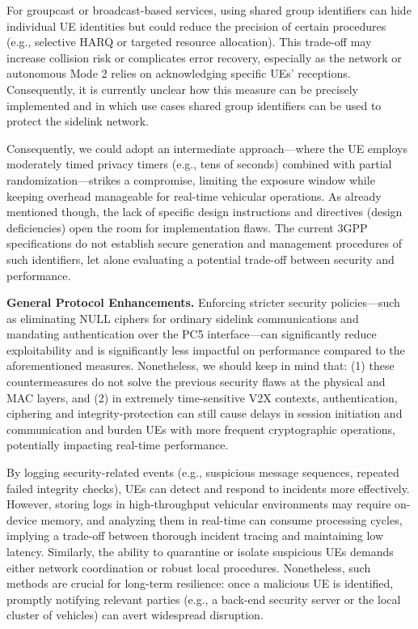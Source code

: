 For groupcast or broadcast-based services, using shared group identifiers can hide individual UE identities but could reduce the precision of certain procedures (e.g., selective HARQ or targeted resource allocation). This trade-off may increase collision risk or complicates error recovery, especially as the network or autonomous Mode 2 relies on acknowledging specific UEs’ receptions. Consequently, it is currently unclear how this measure can be precisely implemented and in which use cases shared group identifiers can be used to protect the sidelink network.

Consequently, we could adopt an intermediate approach—where the UE employs moderately timed privacy timers (e.g., tens of seconds) combined with partial randomization—strikes a compromise, limiting the exposure window while keeping overhead manageable for real-time vehicular operations. As already mentioned though, the lack of specific design instructions and directives (design deficiencies) open the room for implementation flaws. The current 3GPP specifications do not establish secure generation and management procedures of such identifiers, let alone evaluating a potential trade-off between security and performance.

\textbf{General Protocol Enhancements.} Enforcing stricter security policies—such as eliminating NULL ciphers for ordinary sidelink communications and mandating authentication over the PC5 interface—can significantly reduce exploitability and is significantly less impactful on performance compared to the aforementioned measures. Nonetheless, we should keep in mind that: (1) these countermeasures do not solve the previous security flaws at the physical and MAC layers, and (2) in extremely time-sensitive V2X contexts, authentication, ciphering and integrity-protection can still cause delays in session initiation and communication and burden UEs with more frequent cryptographic operations, potentially impacting real-time performance. 

By logging security-related events (e.g., suspicious message sequences, repeated failed integrity checks), UEs can detect and respond to incidents more effectively. However, storing logs in high-throughput vehicular environments may require on-device memory, and analyzing them in real-time can consume processing cycles, implying a trade-off between thorough incident tracing and maintaining low latency. Similarly, the ability to quarantine or isolate suspicious UEs demands either network coordination or robust local procedures. Nonetheless, such methods are crucial for long-term resilience: once a malicious UE is identified, promptly notifying relevant parties (e.g., a back-end security server or the local cluster of vehicles) can avert widespread disruption. 

